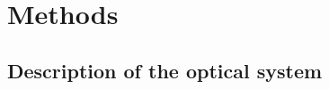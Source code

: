\documentclass[preprint]{iucr}
\begin{document}


\section{Methods}\label{sec:methods}

\subsection{Description of the optical system}\label{sec:descriptionsystem}
\end{document}
